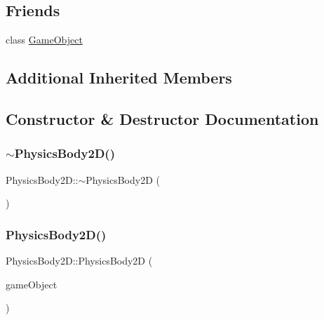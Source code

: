 \subsection*{Friends}
\begin{DoxyCompactItemize}
\item 
class \hyperlink{class_mason_1_1_physics_body2_d_a00df87c957d8f7ee0fc51f07a0542f4a}{Game\+Object}
\end{DoxyCompactItemize}
\subsection*{Additional Inherited Members}


\subsection{Constructor \& Destructor Documentation}
\hypertarget{class_mason_1_1_physics_body2_d_a9cd23100f41c0ae3dbce853e88f804e1}{}\label{class_mason_1_1_physics_body2_d_a9cd23100f41c0ae3dbce853e88f804e1} 
\subsubsection{\texorpdfstring{$\sim$\+Physics\+Body2\+D()}{~PhysicsBody2D()}}
{\footnotesize\ttfamily Physics\+Body2\+D\+::$\sim$\+Physics\+Body2D (\begin{DoxyParamCaption}{ }\end{DoxyParamCaption})}

\hypertarget{class_mason_1_1_physics_body2_d_a4b6b50a1b3945ab0669bcdc0748b3d1c}{}\label{class_mason_1_1_physics_body2_d_a4b6b50a1b3945ab0669bcdc0748b3d1c} 
\subsubsection{\texorpdfstring{Physics\+Body2\+D()}{PhysicsBody2D()}}
{\footnotesize\ttfamily Physics\+Body2\+D\+::\+Physics\+Body2D (\begin{DoxyParamCaption}\item[{\hyperlink{class_mason_1_1_game_object}{Game\+Object} $\ast$}]{game\+Object }\end{DoxyParamCaption})\hspace{0.3cm}{\ttfamily [protected]}}



